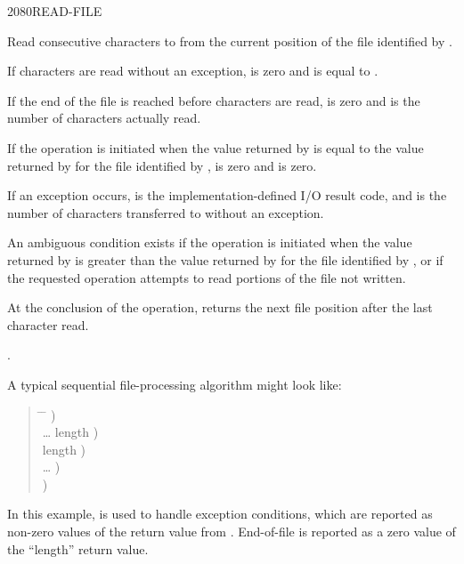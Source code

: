 \begin{worddef}{2080}{READ-FILE}
\item {}

	Read  consecutive characters to  from the
	current position of the file identified by .

	If  characters are read without an exception, 
	is zero and  is equal to .

	If the end of the file is reached before  characters are
	read,  is zero and  is the number of characters
	actually read.

	If the operation is initiated when the value returned by
	 is equal to the value returned by
	 for the file identified by ,
	 is zero and  is zero.

	If an exception occurs,  is the implementation-defined
	I/O result code, and  is the number of characters
	transferred to  without an exception.

	An ambiguous condition exists if the operation is initiated when
	the value returned by  is greater than the
	value returned by  for the file identified by
	, or if the requested operation attempts to read
	portions of the file not written.

	At the conclusion of the operation,  returns
	the next file position after the last character read.

\see {}.

	\begin{rationale} %
		A typical sequential file-processing algorithm might look like:
		\begin{quote}\ttfamily{}
			\begin{tabbing}
			\tab \= \hspace{12em} \= \kill
								\>\>  ) \\
			\> {\ldots}  
											\>	  length ) \\
			 		\>\> \word{p} length ) \\
			\> {\ldots}						\>	  ) \\
								\>\>  )
			\end{tabbing}
		\end{quote}

		In this example,  is used to handle
		exception conditions, which are reported as
		non-zero values of the  return value from
		. End-of-file is reported as a zero value of
		the ``length'' return value.
	\end{rationale}
\end{worddef}


